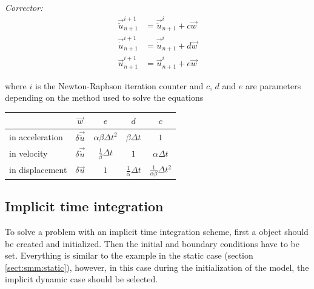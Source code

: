 \noindent\textit{Corrector:}
\begin{align} \vec{\ddot{u}}_{n+1}^{i+1} &= \vec{\ddot{u}}_{n+1}^{i} +
c \vec{w} \\ \vec{\dot{u}}_{n+1}^{i+1} &= \vec{\dot{u}}_{n+1}^{i} + d
\vec{w} \\ \vec{u}_{n+1}^{i+1} &= \vec{u}_{n+1}^{i} + e \vec{w}
\end{align}

where $i$ is the Newton-Raphson iteration counter and $c$, $d$ and $e$
are parameters depending on the method used to solve the equations

\begin{center}
  \begin{tabular}{lcccc} \toprule & $\vec{w}$ & $e$ & $d$ & $c$\\
\midrule in acceleration &$ \delta\vec{\ddot{u}}$ & $\alpha \beta
\Delta t^2$ &$\beta \Delta t$ &$1$\\ in velocity & $
\delta\vec{\dot{u}}$& $\frac{1}{\beta} \Delta t$ & $1$ & $\alpha
\Delta t$\\ in displacement &$\delta\vec{u}$ & $ 1$ &
$\frac{1}{\alpha} \Delta t$ & $\frac{1}{\alpha \beta} \Delta t^2$\\
\bottomrule
  \end{tabular}
\end{center}



\subsection{Implicit time integration} To solve a problem with an
implicit time integration scheme, first a 
object should be created and initialized.  Then the initial and
boundary conditions have to be set.  Everything is similar to the
example in the static case (section \ref{sect:smm:static}), however,
in this case during the initialization of the model, the implicit
dynamic case should be selected.

